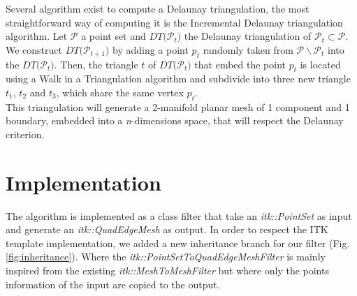 \documentclass{InsightArticle}
\begin{document}
Several algorithm exist to compute a Delaunay triangulation, the most straightforward way of computing it is the Incremental Delaunay triangulation algorithm. Let $\mathcal{P}$ a point set and $\mathit{DT(} \mathcal{P_{\mathit{t}}} \mathit{)}$ the Delaunay triangulation of $\mathcal{P_{\mathit{t}}}\subset\mathcal{P}$. We construct $\mathit{DT(} \mathcal{P_{\mathit{t+1}}} \mathit{)}$ by adding a point $\mathit{p_{t}}$ randomly taken from $\mathcal{P} \backslash \mathcal{P_{\mathit{t}}}$ into the $\mathit{DT(} \mathcal{P_{\mathit{t}}} \mathit{)}$. Then, the triangle $\mathit{t}$ of $\mathit{DT(} \mathcal{P_{\mathit{t}}} \mathit{)}$ that embed the point $\mathit{p_{t}}$ is located using a Walk in a Triangulation algorithm and subdivide into three new triangle $\mathit{t_{1}}$, $\mathit{t_{2}}$ and $\mathit{t_{3}}$, which share the same vertex $\mathit{p_{t}}$.\\

This triangulation will generate a 2-manifold planar mesh of 1 component and 1 boundary, embedded into a \emph{n}-dimensions space, that will respect the Delaunay criterion.

\section{Implementation}

The algorithm is implemented as a class filter that take an \emph{itk::PointSet} as input and generate an \emph{itk::QuadEdgeMesh} as output. In order to respect the ITK template implementation, we added a new inheritance branch for our filter (Fig. \ref{fig:inheritance}). Where the \emph{itk::PointSetToQuadEdgeMeshFilter} is mainly inspired from the existing \emph{itk::MeshToMeshFilter} but where only the points information of the input are copied to the output.
\end{document}
